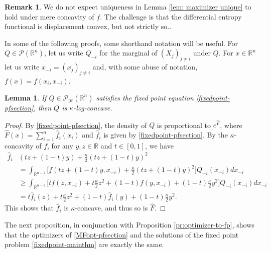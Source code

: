 \documentclass[11pt,reqno]{amsart}
\numberwithin{equation}{section}
\newtheorem{lemma}[theorem]{Lemma}
\theoremstyle{definition}
\newtheorem{remark}[theorem]{Remark}
\def\R{{\mathbb R}}
\def\P{{\mathcal P}}
\def\Pprod{\P_{\mathrm{pr}}}
\begin{document}
\begin{remark}
We do not expect uniqueness in Lemma \ref{lem: maximizer unique} to hold under mere concavity of $f$.
The challenge is that the differential entropy functional is displacement convex, but not strictly so..
\end{remark}

In some of the following proofs, some shorthand notation will be useful. For $Q \in \P(\R^n)$, let us write $Q_{-i}$ for the marginal of $(X_j)_{j \neq i}$ under $Q$. For $x \in \R^n$ let us write $x_{-i}=(x_j)_{j \neq i}$ and, with some abuse of notation, $f(x)=f(x_i,x_{-i})$. 

\begin{lemma} \label{lem: optimizer log-concave}
	 If $Q \in \Pprod(\R^n)$ satisfies the fixed point equation \eqref{fixedpoint-pfsection}, then $Q$ is $\kappa$-log-concave.
\end{lemma}		
\begin{proof}
By \eqref{fixedpoint-pfsection}, the density of $Q$ is proportional to $e^{\hat{F}}$, where $\hat{F}(x)=\sum_{i=1}^n \hat{f}_i(x_i)$ and $ \hat{f}_i $ is given by \eqref{fixedpoint-pfsection}.  By the $ \kappa $-concavity of $ f $,  for any $ y, z \in \R $ and $t\in [0,1] $,  we have
	\begin{align*}
		\hat{f}_i &(tz + (1- t) y ) + \frac{\kappa}{2}(tz + (1-t)y)^2 \\
		&= \int_{\R^{n-1}} \Big[f(tz + (1 - t) y, x_{-i})+ \frac{\kappa}{2}(tz + (1-t)y)^2\Big] Q_{-i} (x_{-i})dx_{-i} \\
		&\ge \int_{\R^{n-1}} \Big[tf(z, x_{-i})+ t\frac{\kappa}{2}z^2 + (1-t)f(y, x_{-i}) + (1-t)\frac{\kappa}{2}y^2\Big] Q_{-i} (x_{-i})dx_{-i}  \\
		&= t\hat{f}_i(z) + t\frac{\kappa}{2}z^2 + (1-t)\hat{f}_i(y)  + (1-t)\frac{\kappa}{2}y^2.
	\end{align*}
	This shows that $\hat{f}_i$ is $\kappa$-concave, and thus so is $\hat{F}$.
\end{proof}


The next proposition, in conjunction with Proposition \ref{pr:optimizer-to-fp}, shows that the optimizers of \eqref{MFopt-pfsection} and the solutions of the fixed point problem \eqref{fixedpoint-mainthm} are exactly the same.
\end{document}
